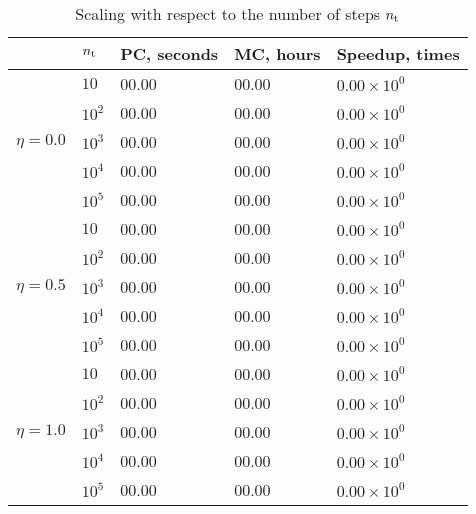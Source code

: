 \begin{table}[h]
  \vspace{-0.5em}
  \caption{Scaling with respect to the number of steps \textnormal{${n_\text{t}}$}}
  \vspace{-0.5em}
  \begin{tabular*}{1\linewidth}{cL{20pt}R{50pt}R{50pt}R{60pt}}
    \toprule
    & ${n_\text{t}}$ & PC, seconds & MC, hours & Speedup, times \\
    \midrule
    \midrule
    & $10$   & 00.00 & 00.00 & $0.00 \times 10^0$ \\
    & $10^2$ & 00.00 & 00.00 & $0.00 \times 10^0$ \\
    & $10^3$ & 00.00 & 00.00 & $0.00 \times 10^0$ \\
    & $10^4$ & 00.00 & 00.00 & $0.00 \times 10^0$ \\
    & $10^5$ & 00.00 & 00.00 & $0.00 \times 10^0$ \\
    \midrule
    & $10$   & 00.00 & 00.00 & $0.00 \times 10^0$ \\
    & $10^2$ & 00.00 & 00.00 & $0.00 \times 10^0$ \\
    & $10^3$ & 00.00 & 00.00 & $0.00 \times 10^0$ \\
    & $10^4$ & 00.00 & 00.00 & $0.00 \times 10^0$ \\
    & $10^5$ & 00.00 & 00.00 & $0.00 \times 10^0$ \\
    \midrule
    & $10$   & 00.00 & 00.00 & $0.00 \times 10^0$ \\
    & $10^2$ & 00.00 & 00.00 & $0.00 \times 10^0$ \\
    & $10^3$ & 00.00 & 00.00 & $0.00 \times 10^0$ \\
    & $10^4$ & 00.00 & 00.00 & $0.00 \times 10^0$ \\
    & $10^5$ & 00.00 & 00.00 & $0.00 \times 10^0$ \\
    \bottomrule
  \end{tabular*}
  \vspace{-0.5em}
\end{table}
